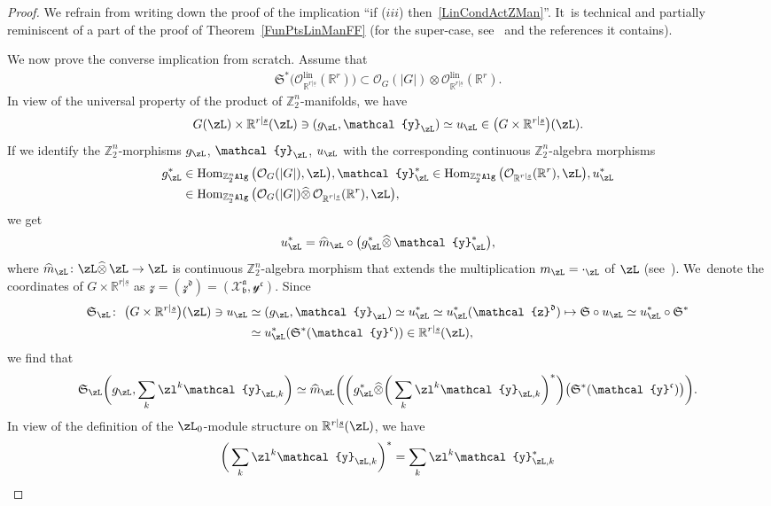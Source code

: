 \documentclass[10pt,a4paper]{amsart}
\newcommand{\op}[1]{\operatorname{#1}}
\newcommand{\R}{{\mathbb R}}
\newcommand{\Z}{{\mathbb Z}}
\def\ul{\underline}
\def\cO{\mathcal{O}}
\def\ul{\underline}
\newcommand{\0}{\otimes}
\newcommand{\z}{\Z_2^n}
\numberwithin{equation}{section}
\begin{document}
\begin{proof}
We refrain from writing down the proof of the implication ``if ($iii$) then~\eqref{LinCondActZMan}''. It~is technical and partially reminiscent of a part of the proof of Theorem~\ref{FunPtsLinManFF} (for the super-case, see~\cite{Carmeli:2018} and the references it contains).

We now prove the converse implication from scratch. Assume that
\begin{gather}\label{LinAssumption}
\mathfrak{S}^*\big(\cO_{\R^{r|\ul s}}^{\op{lin}}(\R^r)\big)\subset \cO_{G}(|G|)\otimes\cO_{\R^{r|\ul s}}^{\op{lin}}(\R^r).
\end{gather}
In view of the universal property of the product of $\z$-manifolds, we have
\[
G(\zL)\times \R^{r|\ul s}(\zL)\ni(g_\zL,\mathcal{y}_\zL)\simeq u_\zL\in\big(G\times \R^{r|\ul s}\big)(\zL).
\]
If we identify the $\z$-morphisms $g_\zL$, $\mathcal{y}_\zL$, $u_\zL$ with the corresponding continuous $\z$-algebra morphisms
\begin{align*}
g_\zL^*&\in\op{Hom}_{\z\tt Alg}\big(\cO_G(|G|),\zL\big),\mathcal{y}^*_\zL
\in\op{Hom}_{\z\tt Alg}\big(\cO_{\R^{r|\ul s}}(\R^r),\zL\big),u_\zL^*
\\
&\in\op{Hom}_{\z\tt Alg}\big(\cO_G(|G|)\widehat{\0}\,\cO_{\R^{r|\ul s}}(\R^r),\zL\big),
\end{align*}
we get
\[
u_\zL^*=\widehat{m}_\zL\circ\big(g_\zL^*\widehat\0\,\mathcal{y}_\zL^*\big),
\]
where $\widehat{m}_\zL\colon \zL\widehat{\0}\,\zL\to\zL$ is continuous $\z$-algebra morphism that extends the multiplication \mbox{$m_\zL=\cdot_\zL$} of $\zL$ (see~\cite{Bruce:2019}). We~denote the coordinates of $G\times \R^{r|\ul s}$ as $\mathcal{z}=(\mathcal{z}^{\mathfrak{d}})=(\mathcal{X}^{\mathfrak{a}}_{\mathfrak{b}},\mathcal{y}^{\mathfrak{c}})$. Since
\begin{align*}
\mathfrak{S}_\zL\colon\ \big(G\times\R^{r|\ul s}\big)(\zL)\ni u_\zL&\simeq (g_\zL,\mathcal{y}_\zL)\simeq u^*_\zL\simeq u^*_\zL(\mathcal{z}^{\mathfrak{d}})\mapsto \mathfrak{S}\circ u_\zL\simeq u_\zL^*\circ\mathfrak{S}^*
\\
&\simeq u_\zL^*(\mathfrak{S}^*(\mathcal{y}^{\mathfrak{c}}))\in\R^{r|\ul s}(\zL),
\end{align*}
we find that
\[
\mathfrak{S}_\zL\bigg(g_\zL,\sum_k\zl^k\mathcal{y}_{\zL,k}\bigg)\simeq\widehat{m}_\zL \bigg(\bigg(g_\zL^*\widehat{\0}\bigg(\sum_k\zl^k\mathcal{y}_{\zL,k}\bigg)^*\bigg)\big(\mathfrak{S}^*
(\mathcal{y}^{\mathfrak{c}})\big)\bigg).
\]
In view of the definition of the $\zL_0$-module structure on $\R^{r|\ul s}(\zL)$, we have
\[
\bigg(\sum_k\zl^k\mathcal{y}_{\zL,k}\bigg)^*=\sum_k\zl^k\mathcal{y}_{\zL,k}^*
\]
\end{proof}
\end{document}
